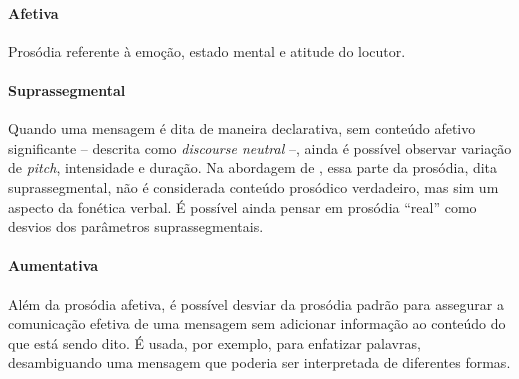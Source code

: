 \paragraph{Afetiva} Prosódia referente à emoção, estado mental e atitude do
locutor.
\paragraph{Suprassegmental} Quando uma mensagem é dita de maneira declarativa,
sem conteúdo afetivo significante -- descrita como \emph{discourse neutral} --,
ainda é possível observar variação de \emph{pitch}, intensidade e duração. Na
abordagem de , essa parte da prosódia, dita
suprassegmental, não é considerada conteúdo prosódico verdadeiro, mas sim um
aspecto da fonética verbal. É possível ainda pensar em prosódia ``real'' como
desvios dos parâmetros suprassegmentais.
\paragraph{Aumentativa} Além da prosódia afetiva, é possível desviar da prosódia
padrão para assegurar a comunicação efetiva de uma mensagem sem adicionar
informação ao conteúdo do que está sendo dito. É usada, por exemplo, para
enfatizar palavras, desambiguando uma mensagem que poderia ser interpretada de
diferentes formas.

